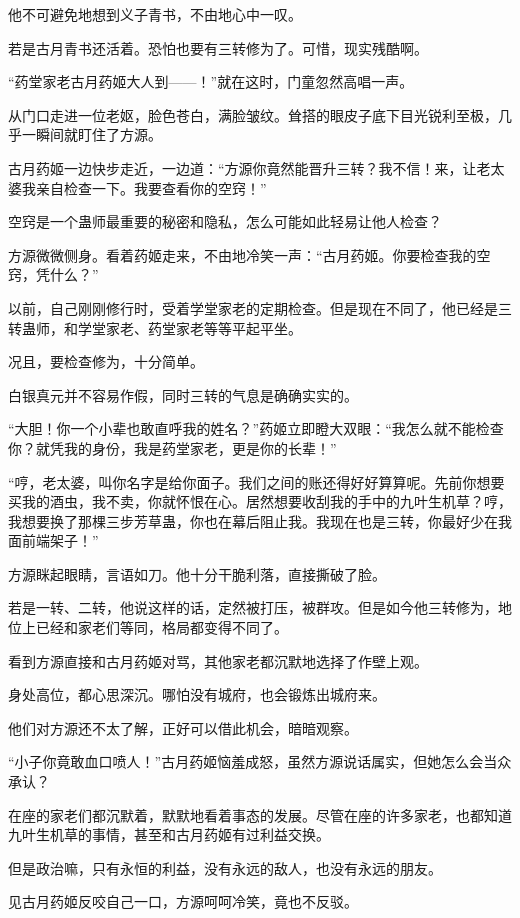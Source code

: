 \begin{this_body}
他不可避免地想到义子青书，不由地心中一叹。

若是古月青书还活着。恐怕也要有三转修为了。可惜，现实残酷啊。

“药堂家老古月药姬大人到——！”就在这时，门童忽然高唱一声。

从门口走进一位老妪，脸色苍白，满脸皱纹。耸搭的眼皮子底下目光锐利至极，几乎一瞬间就盯住了方源。

古月药姬一边快步走近，一边道：“方源你竟然能晋升三转？我不信！来，让老太婆我亲自检查一下。我要查看你的空窍！”

空窍是一个蛊师最重要的秘密和隐私，怎么可能如此轻易让他人检查？

方源微微侧身。看着药姬走来，不由地冷笑一声：“古月药姬。你要检查我的空窍，凭什么？”

以前，自己刚刚修行时，受着学堂家老的定期检查。但是现在不同了，他已经是三转蛊师，和学堂家老、药堂家老等等平起平坐。

况且，要检查修为，十分简单。

白银真元并不容易作假，同时三转的气息是确确实实的。

“大胆！你一个小辈也敢直呼我的姓名？”药姬立即瞪大双眼：“我怎么就不能检查你？就凭我的身份，我是药堂家老，更是你的长辈！”

“哼，老太婆，叫你名字是给你面子。我们之间的账还得好好算算呢。先前你想要买我的酒虫，我不卖，你就怀恨在心。居然想要收刮我的手中的九叶生机草？哼，我想要换了那棵三步芳草蛊，你也在幕后阻止我。我现在也是三转，你最好少在我面前端架子！”

方源眯起眼睛，言语如刀。他十分干脆利落，直接撕破了脸。

若是一转、二转，他说这样的话，定然被打压，被群攻。但是如今他三转修为，地位上已经和家老们等同，格局都变得不同了。

看到方源直接和古月药姬对骂，其他家老都沉默地选择了作壁上观。

身处高位，都心思深沉。哪怕没有城府，也会锻炼出城府来。

他们对方源还不太了解，正好可以借此机会，暗暗观察。

“小子你竟敢血口喷人！”古月药姬恼羞成怒，虽然方源说话属实，但她怎么会当众承认？

在座的家老们都沉默着，默默地看着事态的发展。尽管在座的许多家老，也都知道九叶生机草的事情，甚至和古月药姬有过利益交换。

但是政治嘛，只有永恒的利益，没有永远的敌人，也没有永远的朋友。

见古月药姬反咬自己一口，方源呵呵冷笑，竟也不反驳。


\end{this_body}
